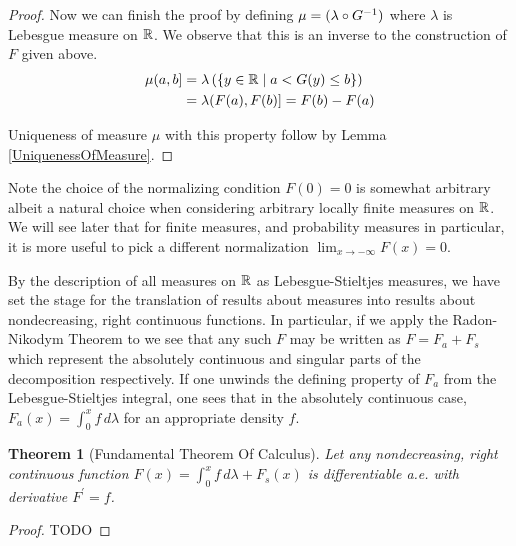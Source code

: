 \documentclass{amsart}
\newtheorem{thm}{Theorem}[section]
\theoremstyle{remark}
\theoremstyle{definition}
\begin{document}
\begin{proof}
Now we can finish the proof by 
defining $\mu = (\lambda \circ G^{-1})$ where $\lambda$ is Lebesgue
measure on $\mathbb{R}$.  We observe that this is an inverse to the
construction of $F$ given above.  
\begin{align*}
\mu (a,b] &= \lambda \left ( \lbrace y \in \mathbb{R} \mid a < G(y)  \leq b
  \rbrace \right ) \\
&= \lambda (F(a), F(b)] = F(b) - F(a)
\end{align*}

Uniqueness of measure $\mu$ with this property follow by Lemma \ref{UniquenessOfMeasure}.
\end{proof}

Note the choice of the normalizing condition $F(0) = 0$ is somewhat
arbitrary albeit a natural choice when considering arbitrary locally
finite measures on $\mathbb{R}$.  We will see later that for finite
measures, and probability
measures in particular, it is more useful to pick a different
normalization $\lim_{x \to -\infty} F(x) = 0$.

By the description of all measures on $\mathbb{R}$ as
Lebesgue-Stieltjes measures, we have set the stage for the
translation of results about measures into results about
nondecreasing, right continuous functions.  In particular, if we apply
the Radon-Nikodym Theorem to we see that any such $F$ may be written
as $F = F_a + F_s$ which represent the absolutely continuous and
singular parts of the decomposition respectively.  If one unwinds the
defining property of $F_a$ from the Lebesgue-Stieltjes integral, one
sees
 that in the absolutely continuous case, $F_a(x) = \int_0^x f \,
 d\lambda$ for an appropriate density $f$.

\begin{thm}[Fundamental Theorem Of Calculus]\label{FundamentalTheoremOfCalculus}Let any nondecreasing, right continuous function $F(x) = \int_0^x
  f \, d\lambda + F_s(x)$ is differentiable a.e. with derivative $F^\prime = f$.
\end{thm}
\begin{proof}
TODO
\end{proof}
\end{document}
